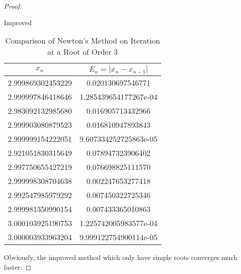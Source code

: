 \begin{enumerate}
\begin{proof}
\begin{table}[H]
		\else
			\begin{subtable}[t]{.49\linewidth}
			\centering
			\caption{Improved}
			\begin{tabular}{|c|c|}
				\hline
				\(x_n\)				&	\(E_n=|x_n-x_{n-1}|\)	\\	\hline
				\footnotesize	2.999869302453229	&	\footnotesize	0.020130697546771	\\	\hline
				\footnotesize	2.999997846418646	&	\footnotesize	1.285439654177267e-04	\\	\hline
				\footnotesize	2.983092132985680	&	\footnotesize	0.016905713432966	\\	\hline
				\footnotesize	2.999903080879523	&	\footnotesize	0.016810947893843	\\	\hline
				\footnotesize	2.999999154222051	&	\footnotesize	9.607334252725863e-05	\\	\hline
				\footnotesize	2.921051830315649	&	\footnotesize	0.078947323906402	\\	\hline
				\footnotesize	2.997750655427219	&	\footnotesize	0.076698825111570	\\	\hline
				\footnotesize	2.999998308704638	&	\footnotesize	0.002247653277418	\\	\hline
				\footnotesize	2.992547985979292	&	\footnotesize	0.007450322725346	\\	\hline
				\footnotesize	2.999981350990154	&	\footnotesize	0.007433365010863	\\	\hline
				\footnotesize	3.000103925190753	&	\footnotesize	1.225742005983577e-04	\\	\hline
				\footnotesize	3.000003933963204	&	\footnotesize	9.999122754900114e-05	\\	\hline
			\end{tabular}
			\end{subtable}
		\fi

		\caption{Comparison of Newton's Method on Iteration at a Root of Order 3}
		\label{newtoncompare3}
	\end{table}
	Obviously, the improved method which only have simple roots converges much faster.
	\end{proof}
\end{enumerate}


